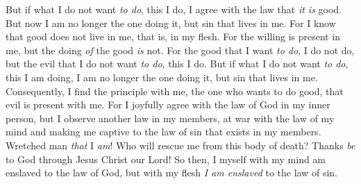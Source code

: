 \begin{biblechapter}
\verse But if what I do not want \textit{to do}, this I do, I agree with the law that \textit{it is} good.
\verse But now I am no longer the one doing it, but sin that lives in me.
\verse For I know that good does not live in me, that is, in my flesh. For the willing is present in me, but the doing \textit{of} the good \textit{is} not.
\verse For the good that I want \textit{to do}, I do not do, but the evil that I do not want \textit{to do}, this I do.
\verse But if what I do not want \textit{to do}, this I am doing, I am no longer the one doing it, but sin that lives in me.
\verse Consequently, I find the principle with me, the one who wants to do good, that evil is present with me.
\verse For I joyfully agree with the law of God in my inner person,
\verse but I observe another law in my members, at war with the law of my mind and making me captive to the law of sin that exists in my members.
\verse Wretched man \textit{that} I \textit{am}! Who will rescue me from this body of death?
\verse Thanks \textit{be} to God through Jesus Christ our Lord! So then, I myself with my mind am enslaved to the law of God, but with my flesh \textit{I am enslaved} to the law of sin.
\end{biblechapter}

